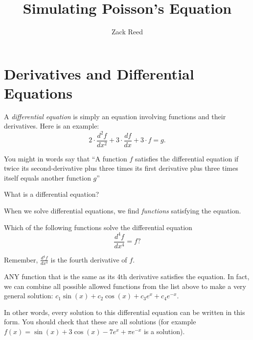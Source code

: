 \documentclass{ximera}
\author{Zack Reed}
\title{Simulating Poisson's Equation}
\begin{document}
\begin{abstract}


\end{abstract}
\maketitle

\section{Derivatives and Differential Equations}

A \textit{differential equation} is
simply an equation involving functions and their derivatives. Here is an example:
\[
2\cdot \frac{d^2f}{dx^2} + 3\cdot \frac{df}{dx} + 3\cdot f = g.
\]

You might in words say that ``A function $f$ satisfies the differential equation if twice its second-derivative plus three times its first derivative plus three times itself equals another function $g$''

\begin{question}
  What is a differential equation?
  \begin{multipleChoice}
  \end{multipleChoice}
\end{question}

When we solve differential equations, we find
\textit{functions} satisfying the equation.
\begin{question}
  Which of the following functions solve the differential equation
  \[
  \frac{d^4f}{dx^4} = f?
  \]

  \begin{hint}
    Remember, $\frac{d^4f}{dx^4}$ is the fourth derivative of $f$.
  \end{hint}

  \begin{selectAll}
  \end{selectAll}
  \begin{feedback}
    ANY function that is the same as its 4th derivative satisfies the equation. 
    In fact, we can combine all possible allowed functions from the list above to make a very general solution: $c_1\sin(x)+c_2\cos(x)+c_3e^x+c_4e^{-x}$.  
    
    In other words, every
    solution to this differential equation can be written in this form.
    You should check that these are all solutions (for example $f(x) =
    \sin(x)+3\cos(x)-7e^x+\pi e^{-x}$ is a solution). 
  \end{feedback}
\end{question}
\end{document}
